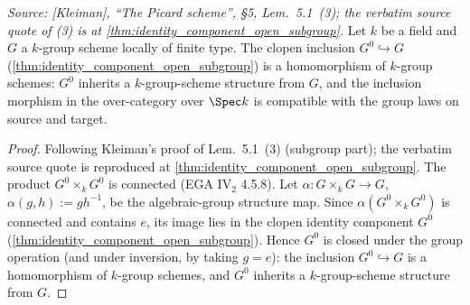 \begin{theorem}

  \label{thm:identity_component_is_subgroup_homomorphism}

  \textit{Source: [Kleiman], ``The Picard scheme'', \S 5,
  Lem.~5.1~(3); the verbatim source quote of (3) is at
  \cref{thm:identity_component_open_subgroup}.}
  Let \(k\) be a field and \(G\) a \(k\)-group scheme locally of finite
  type. The clopen inclusion \(G^0 \hookrightarrow G\)
  (\cref{thm:identity_component_open_subgroup}) is a homomorphism of
  \(k\)-group schemes: \(G^0\) inherits a \(k\)-group-scheme structure
  from \(G\), and the inclusion morphism in the over-category over
  \(\Spec k\) is compatible with the group laws on source and target.
\end{theorem}

\begin{proof}
  Following Kleiman's proof of Lem.~5.1~(3) (subgroup part); the
  verbatim source quote is reproduced at
  \cref{thm:identity_component_open_subgroup}.
  The product \(G^0 \times_k G^0\) is connected
  (EGA IV\(_2\) 4.5.8). Let \(\alpha : G \times_k G \to G\),
  \(\alpha(g, h) := g h^{-1}\), be the algebraic-group structure map.
  Since \(\alpha(G^0 \times_k G^0)\) is connected and contains \(e\), its
  image lies in the clopen identity component \(G^0\)
  (\cref{thm:identity_component_open_subgroup}). Hence \(G^0\) is closed
  under the group operation (and under inversion, by taking \(g = e\)):
  the inclusion \(G^0 \hookrightarrow G\) is a homomorphism of
  \(k\)-group schemes, and \(G^0\) inherits a \(k\)-group-scheme
  structure from \(G\).
\end{proof}


